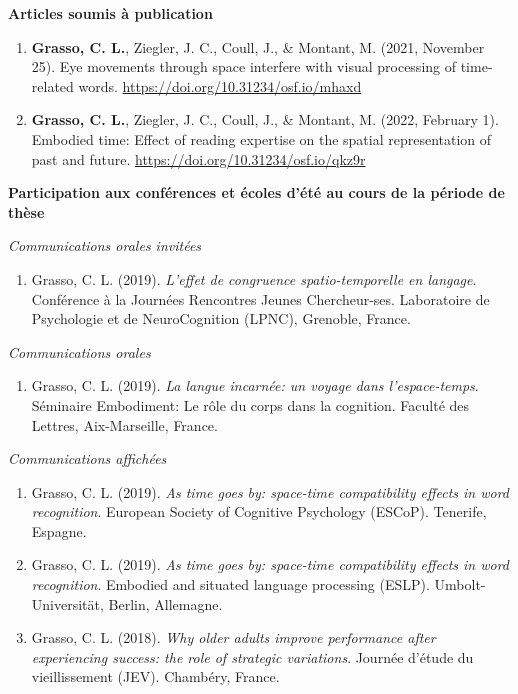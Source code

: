 \documentclass[
  a4paper,12pt,twoside,onecolumn,openright,final,oldfontcommands]{memoir}
\providecommand{\tightlist}{%
  \setlength{\itemsep}{0pt}\setlength{\parskip}{0pt}}
\begin{document}
\textbf{Articles soumis à publication}

\begin{enumerate}
\def\labelenumi{\arabic{enumi}.}
\item
  \textbf{Grasso, C. L.}, Ziegler, J. C., Coull, J., \& Montant, M. (2021, November 25). Eye movements through space interfere with visual processing of time-related words. \url{https://doi.org/10.31234/osf.io/mhaxd}
\item
  \textbf{Grasso, C. L.}, Ziegler, J. C., Coull, J., \& Montant, M. (2022, February 1). Embodied time: Effect of reading expertise on the spatial representation of past and future. \url{https://doi.org/10.31234/osf.io/qkz9r}
\end{enumerate}

\textbf{Participation aux conférences et écoles d'été au cours de la période de thèse}

\emph{Communications orales invitées}

\begin{enumerate}
\def\labelenumi{\arabic{enumi}.}
\tightlist
\item
  Grasso, C. L. (2019). \emph{L'effet de congruence spatio-temporelle en langage}. Conférence à la Journées Rencontres Jeunes Chercheur-ses. Laboratoire de Psychologie et de NeuroCognition (LPNC), Grenoble, France.
\end{enumerate}

\newpage

\emph{Communications orales}

\begin{enumerate}
\def\labelenumi{\arabic{enumi}.}
\tightlist
\item
  Grasso, C. L. (2019). \emph{La langue incarnée: un voyage dans l'espace-temps}. Séminaire Embodiment: Le rôle du corps dans la cognition. Faculté des Lettres, Aix-Marseille, France.
\end{enumerate}

\emph{Communications affichées}

\begin{enumerate}
\def\labelenumi{\arabic{enumi}.}
\item
  Grasso, C. L. (2019). \emph{As time goes by: space-time compatibility effects in word recognition}. European Society of Cognitive Psychology (ESCoP). Tenerife, Espagne.
\item
  Grasso, C. L. (2019). \emph{As time goes by: space-time compatibility effects in word recognition}. Embodied and situated language processing (ESLP). Umbolt-Universität, Berlin, Allemagne.
\item
  Grasso, C. L. (2018). \emph{Why older adults improve performance after experiencing success: the role of strategic variations}. Journée d'étude du vieillissement (JEV). Chambéry, France.
\end{enumerate}
\end{document}
